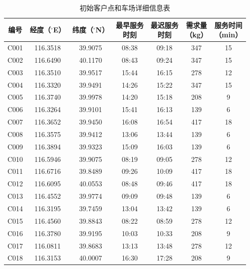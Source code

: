\documentclass{setp-new}
\begin{document}
\begin{table}[H]
\centering
\caption{初始客户点和车场详细信息表}
\label{tab:initial-nodes}
\small
\renewcommand{\arraystretch}{0.88}
\setlength{\tabcolsep}{1.2pt}
\begin{tabular*}{\textwidth}{@{\extracolsep{\fill}}ccccccc@{}}
\toprule
编号 & 经度（$^{\circ}$E） & 纬度（$^{\circ}$N） & \makecell{最早服务\\时刻} & \makecell{最迟服务\\时刻} & \makecell{需求量\\（kg）} & \makecell{服务时间\\（min）}\\
\midrule
C001 & 116.3518 & 39.9075 & 08:38 & 09:18 & 347 & 15\\
C002 & 116.6490 & 40.1170 & 08:43 & 09:24 & 347 & 15\\
C003 & 116.3510 & 39.9517 & 15:44 & 16:15 & 278 & 12\\
C004 & 116.3320 & 39.9491 & 14:26 & 15:22 & 347 & 15\\
C005 & 116.3740 & 39.9978 & 14:20 & 15:18 & 208 & 9\\
C006 & 116.3264 & 39.9101 & 15:41 & 16:13 & 139 & 6\\
C007 & 116.3652 & 39.9450 & 16:08 & 16:54 & 417 & 18\\
C008 & 116.3575 & 39.9412 & 13:06 & 13:44 & 139 & 6\\
C009 & 116.3894 & 39.9323 & 15:09 & 16:03 & 139 & 6\\
C010 & 116.5946 & 39.9075 & 08:19 & 09:05 & 278 & 12\\
C011 & 116.6716 & 39.8489 & 09:26 & 10:09 & 417 & 18\\
C012 & 116.6095 & 40.0553 & 08:48 & 09:46 & 417 & 18\\
C013 & 116.4552 & 39.9774 & 09:09 & 09:48 & 139 & 6\\
C014 & 116.3195 & 39.7459 & 13:04 & 13:42 & 139 & 6\\
C015 & 116.4560 & 39.8843 & 08:22 & 08:59 & 278 & 12\\
C016 & 116.3780 & 39.9195 & 10:03 & 10:33 & 208 & 9\\
C017 & 116.0811 & 39.8683 & 13:13 & 13:48 & 278 & 12\\
C018 & 116.3153 & 40.0007 & 16:30 & 17:28 & 208 & 9\\
\bottomrule
\end{tabular*}
\end{table}
\end{document}
